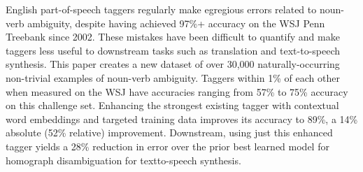 English part-of-speech taggers regularly make egregious errors related to noun-verb ambiguity, despite having achieved 97\%+ accuracy on the WSJ Penn Treebank since 2002. These mistakes have been difficult to quantify and make taggers less useful to downstream tasks such as translation and text-to-speech synthesis. This paper creates a new dataset of over 30,000 naturally-occurring non-trivial examples of noun-verb ambiguity. Taggers within 1\% of each other when measured on the WSJ have accuracies ranging from 57\% to 75\% accuracy on this challenge set. Enhancing the strongest existing tagger with contextual word embeddings and targeted training data improves its accuracy to 89\%, a 14\% absolute (52\% relative) improvement. Downstream, using just this enhanced tagger yields a 28\% reduction in error over the prior best learned model for homograph disambiguation for textto-speech synthesis.
